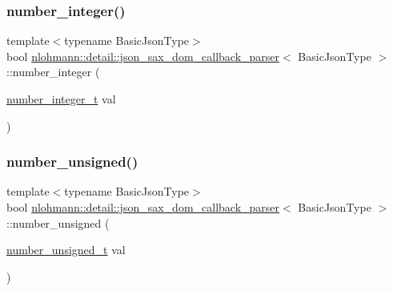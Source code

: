\subsubsection{\texorpdfstring{number\+\_\+integer()}{number\_integer()}}
{\footnotesize\ttfamily template$<$typename Basic\+Json\+Type$>$ \\
bool \hyperlink{classnlohmann_1_1detail_1_1json__sax__dom__callback__parser}{nlohmann\+::detail\+::json\+\_\+sax\+\_\+dom\+\_\+callback\+\_\+parser}$<$ Basic\+Json\+Type $>$\+::number\+\_\+integer (\begin{DoxyParamCaption}\item[{\hyperlink{classnlohmann_1_1detail_1_1json__sax__dom__callback__parser_a3ba8fc7a8d83c5b0eeb3b543ad844b8d}{number\+\_\+integer\+\_\+t}}]{val }\end{DoxyParamCaption})\hspace{0.3cm}{\ttfamily [inline]}}

\mbox{\label{classnlohmann_1_1detail_1_1json__sax__dom__callback__parser_acabb231463bf669441c22e4ea385a9fb}} 
\subsubsection{\texorpdfstring{number\+\_\+unsigned()}{number\_unsigned()}}
{\footnotesize\ttfamily template$<$typename Basic\+Json\+Type$>$ \\
bool \hyperlink{classnlohmann_1_1detail_1_1json__sax__dom__callback__parser}{nlohmann\+::detail\+::json\+\_\+sax\+\_\+dom\+\_\+callback\+\_\+parser}$<$ Basic\+Json\+Type $>$\+::number\+\_\+unsigned (\begin{DoxyParamCaption}\item[{\hyperlink{classnlohmann_1_1detail_1_1json__sax__dom__callback__parser_a2406c5125f7128fb9c01921df2903001}{number\+\_\+unsigned\+\_\+t}}]{val }\end{DoxyParamCaption})\hspace{0.3cm}{\ttfamily [inline]}}

\mbox{\label{classnlohmann_1_1detail_1_1json__sax__dom__callback__parser_a5c9603e79a71713f5e8cf12cba837dbb}} 
